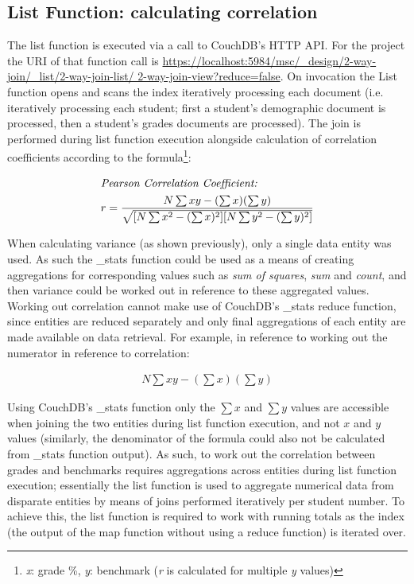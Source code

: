 

\subsection{List Function: calculating correlation}
The list function is executed via a call to CouchDB's HTTP API. For the project the URI of that function call is \url{https://localhost:5984/msc/\_design/2-way-join/\_list/2-way-join-list/ 2-way-join-view?reduce=false}. On invocation the List function opens and scans the index iteratively processing each document (i.e. iteratively processing each student; first a student's demographic document is processed, then a student's grades documents are processed). The join is performed during list function execution alongside calculation of correlation coefficients according to the formula\footnote{\textit{x}: grade \%, \textit{y}: benchmark (\textit{r} is calculated for multiple \textit{y} values)}: \begin{spreadlines}{15pt}
    \begin{gather*}
        \intertext{\textit{Pearson Correlation Coefficient:}}
        r = \frac{N\sum{xy} - (\sum{x})(\sum{y})}{\sqrt{[N\sum{x^2} - (\sum{x})^2][N\sum{y^2} - (\sum{y})^2]}}
    \end{gather*}
\end{spreadlines}

When calculating variance (as shown previously), only a single data entity was used. As such the \_stats function could be used as a means of creating aggregations for corresponding values such as \textit{sum of squares}, \textit{sum} and \textit{count}, and then variance could be worked out in reference to these aggregated values. Working out correlation cannot make use of CouchDB's \_stats reduce function, since entities are reduced separately and only final aggregations of each entity are made available on data retrieval. For example, in reference to working out the numerator in reference to correlation: \begin{spreadlines}{15pt}
    \begin{gather*}
        N\sum{xy} - (\sum{x})(\sum{y})
    \end{gather*}
\end{spreadlines}

Using CouchDB's \_stats function only the $\sum{x}$ and $\sum{y}$ values are accessible when joining the two entities during list function execution, and not $x$ and $y$ values (similarly, the denominator of the formula could also not be calculated from \_stats function output). As such, to work out the correlation between grades and benchmarks requires aggregations across entities during list function execution; essentially the list function is used to aggregate numerical data from disparate entities by means of joins performed iteratively per student number. To achieve this, the list function is required to work with running totals as the index (the output of the map function without using a reduce function) is iterated over.

